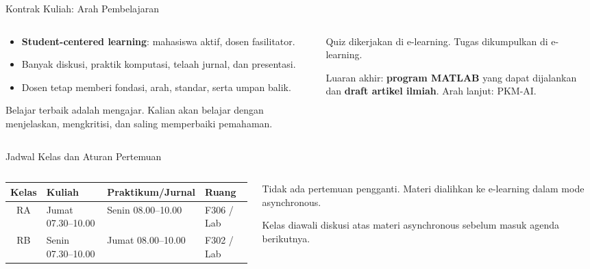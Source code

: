 \documentclass[aspectratio=169,10pt]{beamer}
\begin{document}
\begin{frame}{Kontrak Kuliah: Arah Pembelajaran}
\scriptsize
\begin{columns}[T,totalwidth=\textwidth]
\begin{column}{.50\textwidth}
\begin{bluebox}
\begin{itemize}\setlength\itemsep{2pt}
\item \textbf{Student-centered learning}: mahasiswa aktif, dosen fasilitator.
\item Banyak diskusi, praktik komputasi, telaah jurnal, dan presentasi.
\item Dosen tetap memberi fondasi, arah, standar, serta umpan balik.
\end{itemize}
\end{bluebox}
\begin{greenbox}[Prinsip]
Belajar terbaik adalah mengajar. Kalian akan belajar dengan menjelaskan, mengkritisi, dan saling memperbaiki pemahaman.
\end{greenbox}
\end{column}
\begin{column}{.47\textwidth}
\begin{orangebox}[E-learning]
Quiz dikerjakan di e-learning. Tugas dikumpulkan di e-learning.
\end{orangebox}
\begin{purplebox}[Project]
Luaran akhir: \textbf{program MATLAB} yang dapat dijalankan dan \textbf{draft artikel ilmiah}. Arah lanjut: PKM-AI.
\end{purplebox}
\end{column}
\end{columns}
\end{frame}

\begin{frame}{Jadwal Kelas dan Aturan Pertemuan}
\scriptsize
\begin{columns}[T,totalwidth=\textwidth]
\begin{column}{.58\textwidth}
\renewcommand{\arraystretch}{1.12}
\begin{tabularx}{\linewidth}{c X X X}
\toprule
Kelas & Kuliah & Praktikum/Jurnal & Ruang\\
\midrule
RA & Jumat 07.30--10.00 & Senin 08.00--10.00 & F306 / Lab\\
RB & Senin 07.30--10.00 & Jumat 08.00--10.00 & F302 / Lab\\
\bottomrule
\end{tabularx}
\end{column}
\begin{column}{.38\textwidth}
\begin{goldbox}
Tidak ada pertemuan pengganti. Materi dialihkan ke e-learning dalam mode asynchronous.
\end{goldbox}
\begin{bluebox}
Kelas diawali diskusi atas materi asynchronous sebelum masuk agenda berikutnya.
\end{bluebox}
\end{column}
\end{columns}
\end{frame}
\end{document}
